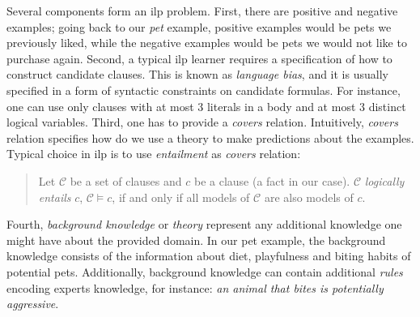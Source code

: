 %
%
%
%
%



Several components form an \gls{ilp} problem.
First, there are positive and negative examples; going back to our \textit{pet} example, positive examples would be pets we previously liked, while the negative examples would be pets we would not like to purchase again.
Second, a typical \gls{ilp} learner requires a specification of how to construct candidate clauses.
This is known as \textit{language bias}, and it is usually specified in a form of syntactic constraints on candidate formulas.
For instance, one can use only clauses with at most 3 literals in a body and at most 3 distinct logical variables.
Third, one has to provide a \textit{covers} relation.
Intuitively, \textit{covers} relation specifies how do we use a theory to make predictions about the examples.
Typical choice in \gls{ilp} is to use \textit{entailment} as \textit{covers} relation:


\begin{quote}
	Let $\mathcal{C}$ be a set of clauses and $c$ be a clause (a fact in our case). $\mathcal{C}$ \textit{logically entails} $c$, $\mathcal{C} \models c$, if and only if all models of $\mathcal{C}$ are also models of $c$.
\end{quote}


Fourth, \textit{background knowledge} or \textit{theory} represent any additional knowledge one might have about the provided domain.
In our pet example, the background knowledge consists of the information about diet, playfulness and biting habits of potential pets.
Additionally, background knowledge can contain additional \textit{rules} encoding experts knowledge, for instance: \textit{an animal that bites is potentially aggressive}.





